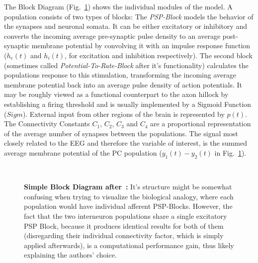 The Block Diagram (Fig.~\ref{fig:Jansen Rit Simple}) shows the individual modules of the model.
A population consists of two types of blocks:
The \textit{PSP-Block} models the behavior of the synapses and neuronal somata.
It can be either excitatory or inhibitory and converts the incoming average pre-synaptic pulse density to
an average post-synaptic membrane potential by convolving it with an
impulse response function ($h_e(t)$ and $h_i(t)$, for excitation and inhibition respectively).
The second block (sometimes called \textit{Potential-To-Rate-Block} after it's functionality)
calculates the populations response to this stimulation, transforming the incoming
average membrane potential back into an average pulse density of action potentials.
It may be roughly viewed as a functional counterpart to the axon hillock by establishing a firing threshold
and is usually implemented by a Sigmoid Function ($Sigm$).
External input from other regions of the brain is represented by $p(t)$.
The Connectivity Constants $C_1$, $C_2$, $C_3$ and $C_4$ are a proportional representation of the
average number of synapses between the populations.
The signal most closely related to the EEG and therefore the variable of interest,
is the summed average membrane potential of the PC population ($y_1(t)-y_2(t)$ in Fig.~\ref{fig:Jansen Rit Simple}).

\\[1em]

\begin{figure}[H]
    \centering
    
    \caption{\textbf{Simple Block Diagram after~\parencite{jansen_electroencephalogram_1995}:}
    It's structure might be somewhat confusing when trying to visualize the biological analogy,
        where each population would have individual afferent PSP-Blocks.
        However, the fact that the two interneuron populations share a single excitatory PSP Block,
        because it produces identical results for both of them (disregarding their individual connectivity factor,
        which is simply applied afterwards), is a computational performance gain,
        thus likely explaining the authors' choice.}
    \label{fig:Jansen Rit Simple}
\end{figure}

